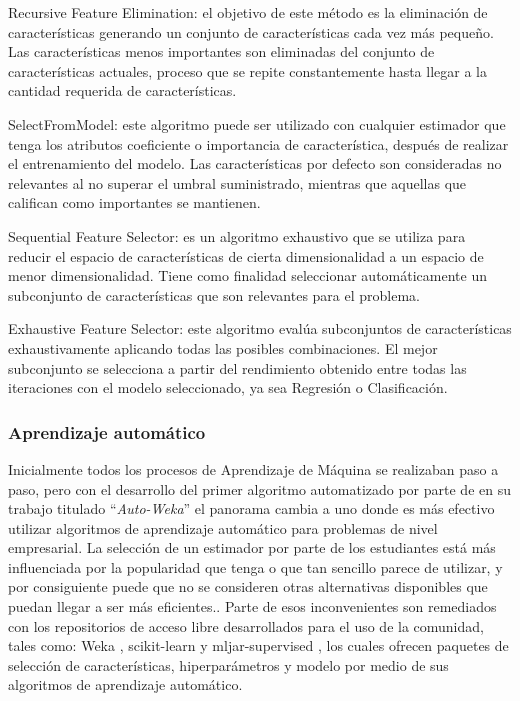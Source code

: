  \begin{APAitemize}
     \item Recursive Feature Elimination: el objetivo de este método es la eliminación de características generando un conjunto de características cada vez más pequeño. Las características menos importantes son eliminadas del conjunto de características actuales, proceso que se repite constantemente hasta llegar a la cantidad requerida de características.
     \item SelectFromModel: este algoritmo puede ser utilizado con cualquier estimador que tenga los atributos coeficiente o importancia de característica, después de realizar el entrenamiento del modelo. Las características por defecto son consideradas no relevantes al no superar el umbral suministrado, mientras que aquellas que califican como importantes se mantienen.
     \item Sequential Feature Selector: es un algoritmo exhaustivo que se utiliza para reducir el espacio de características de cierta dimensionalidad a un espacio de menor dimensionalidad. Tiene como finalidad seleccionar automáticamente un subconjunto de características que son relevantes para el problema. 
     \item Exhaustive Feature Selector: este algoritmo evalúa subconjuntos de características exhaustivamente aplicando todas las posibles combinaciones. El mejor subconjunto se selecciona a partir del rendimiento obtenido entre todas las iteraciones con el modelo seleccionado, ya sea Regresión o Clasificación.
 \end{APAitemize}
 
\subsubsection{Aprendizaje automático}
Inicialmente todos los procesos de Aprendizaje de Máquina se realizaban paso a paso, pero con el desarrollo del primer algoritmo automatizado por parte de \textcite{Thornton2013} en su trabajo titulado ``\textit{Auto-Weka}'' el panorama cambia a uno donde es más efectivo utilizar algoritmos de aprendizaje automático para problemas de nivel empresarial. La selección de un estimador por parte de los estudiantes está más influenciada por la popularidad que tenga o que tan sencillo parece de utilizar, y por consiguiente puede que no se consideren otras alternativas disponibles que puedan llegar a ser más eficientes.. Parte de esos inconvenientes son remediados con los repositorios de acceso libre desarrollados para el uso de la comunidad, tales como: Weka \parencite{Hall2009}, scikit-learn \parencite{scikit-learn} y mljar-supervised \parencite{mljar2018}, los cuales ofrecen paquetes de selección de características, hiperparámetros y modelo por medio de sus algoritmos de aprendizaje automático.

